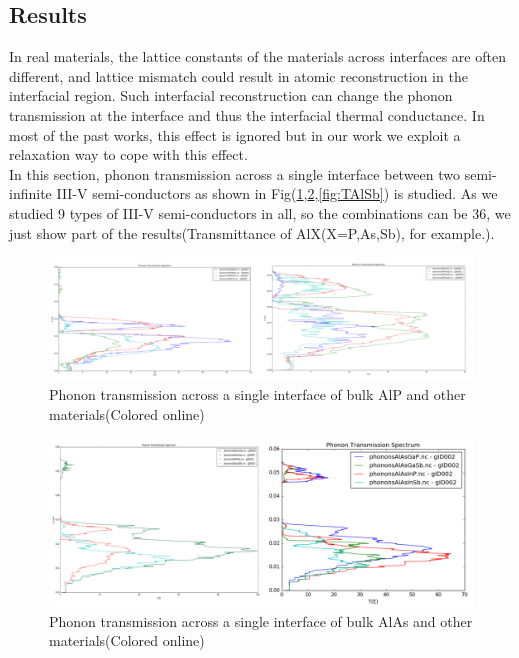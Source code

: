 \subsection{Results}
In real materials, the lattice constants
of the materials across interfaces are often different, and
lattice mismatch could result in atomic reconstruction in
the interfacial region. Such interfacial reconstruction can
change the phonon transmission at the interface and thus
the interfacial thermal conductance. In most of the past works, this effect is ignored but in our work we exploit a relaxation way to cope with this effect.\\
\indent In this section, phonon transmission across a single interface between two semi-infinite III-V semi-conductors as shown in Fig(\ref{fig:TAlP},\ref{fig:TAlAs},\ref{fig:TAlSb}) is studied. As we studied 9 types of III-V semi-conductors in all, so the combinations can be 36, we just show part of the results(Transmittance of AlX(X=P,As,Sb), for example.).

\begin{figure}
\centering
\includegraphics[width=\textwidth]{AlP.png}
\caption{Phonon transmission across a single interface of bulk AlP and other materials(Colored online)}
\label{fig:TAlP}
\end{figure}

\begin{figure}

\centering
\includegraphics[width=\textwidth]{AlAs.png}
\caption{Phonon transmission across a single interface of bulk AlAs and other materials(Colored online)}
\label{fig:TAlAs}
\end{figure}%

